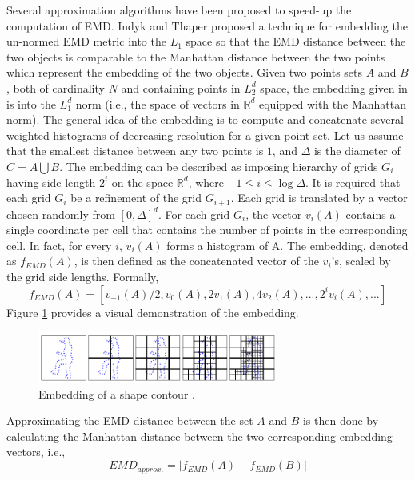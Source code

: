 \iftoggle{edit-mode}{\hspace{0pt}\marginpar{Indyk and Thaper Embedding}}{}
Several approximation algorithms have been proposed to speed-up the computation of EMD. 
Indyk and Thaper \cite{indyk2003fast} proposed a technique for embedding the un-normed EMD metric into the $L_1$ space so that the EMD distance between the two objects is comparable to the Manhattan distance between the two points which represent the embedding of the two objects.  
Given two points sets $A$ and $B$, both of cardinality $N$ and containing points in $L_2^d$ space, the embedding given in \cite{indyk2003fast} is into the $L_1^d$ norm (i.e., the space of vectors in $\mathbb{R}^d$ equipped with the Manhattan norm).
The general idea of the embedding is to compute and concatenate several weighted histograms of decreasing resolution for a given point set. 
Let us assume that the smallest distance between any two points is $1$, and $\Delta$ is the diameter of $C=A \bigcup B$. 
The embedding can be described as imposing hierarchy of grids $G_i$ having side length $2^i$ on the space $\mathbb{R}^d$, where $-1 \leq i \leq \log \Delta$. 
It is required that each grid $G_{i}$ be a refinement of the grid $G_{i+1}$. 
Each grid is translated by a vector chosen randomly from $[0, \Delta]^d$. 
For each grid $G_i$, the vector $v_i(A)$ contains a single coordinate per cell that contains the number of points in the corresponding cell. 
In fact, for every $i$, $v_i(A)$ forms a histogram of A. 
The embedding, denoted as $f_{EMD}(A)$, is then defined as the concatenated vector of the $v_i$'s, scaled by the grid side lengths. 
Formally,
\begin{equation}
f_{EMD}(A) = [v_{-1}(A)/2, v_0(A), 2v_1(A), 4v_2(A),..., 2^iv_i(A),...]
\end{equation} 
Figure \ref{fig:emd_embedding} provides a visual demonstration of the embedding.

\begin{figure}
\centering
\includegraphics[width=0.7\textwidth]{./figures/emd_embedding}       
\caption{Embedding of a shape contour \cite{grauman2004fast}.}
\label{fig:emd_embedding}
\end{figure}

Approximating the EMD distance between the set $A$ and $B$ is then done by calculating the Manhattan distance between the two corresponding embedding vectors, i.e.,
\begin{equation}
EMD_{approx.}=|f_{EMD}(A) - f_{EMD}(B)|
\end{equation}  


